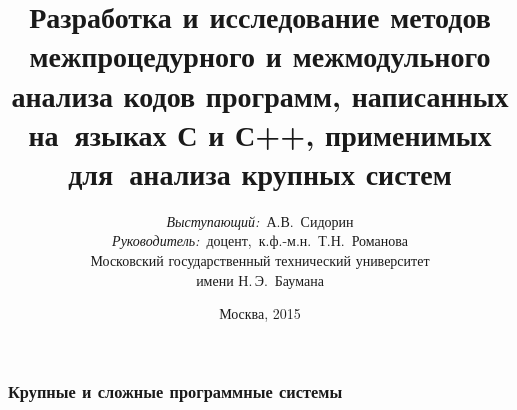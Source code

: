 \documentclass[hyperref={pdfpagelabels=false},10pt]{beamer}
\title{Разработка и  исследование методов межпроцедурного и межмодульного анализа кодов программ, написанных на~языках  С и С++, применимых для~анализа крупных систем}
\author{\small{%
\emph{Выступающий:}~А.В.~Сидорин\\%
\emph{Руководитель:}~доцент,~к.ф.-м.н.~Т.Н.~Романова}\\%
\vspace{30pt}%
Московский государственный технический университет\\имени Н.\,Э.~Баумана%
\vspace{10pt}%
}
\date{\small{Москва, 2015}}
\begin{document}
\maketitle

\begin{frame}
\frametitle{Крупные и сложные программные системы}
\begin{figure}[h]


\end{figure}
\end{frame}
\end{document}
